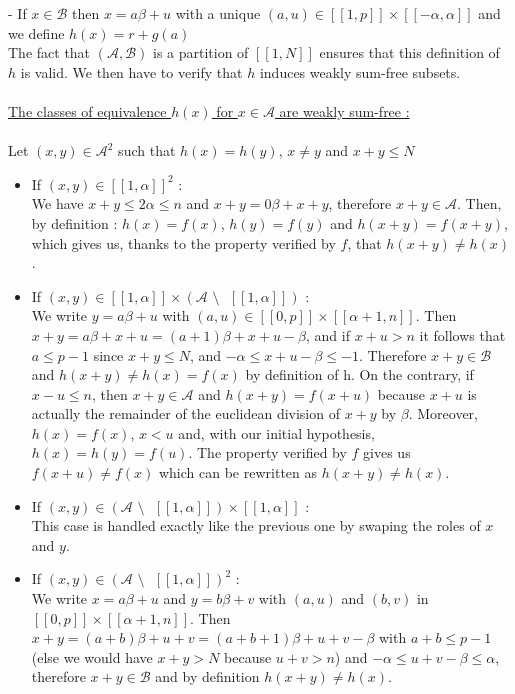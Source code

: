 \documentclass{article}
\newtheorem{computational theorem}{Computational Theorem}[theorem]
\begin{document}
- If $x \in \mathcal{B}$ then $x = a\beta + u$ with a unique $(a,u) \in [\![1,p]\!] \times [\![-\alpha,\alpha]\!]$ and we define $h(x) = r + g(a)$\\
The fact that $(\mathcal{A}, \mathcal{B})$ is a partition of $[\![1,N]\!]$ ensures that this definition of $h$ is valid. We then have to verify that $h$ induces weakly sum-free subsets.\\
\\
\underline{The classes of equivalence $h(x)$ for $x \in \mathcal{A}$ are weakly sum-free :}
\\
\\
Let $(x,y) \in \mathcal{A}^2$ such that $h(x) = h(y)$, $x \neq y$ and $x + y \leqslant N$
\begin{itemize}
\item If $(x,y) \in [\![1,\alpha]\!]^2$ :\\
We have $x + y \leqslant 2\alpha \leqslant n$ and $x + y = 0\beta + x + y$, therefore $x + y \in \mathcal{A}$. Then, by definition : $h(x) = f(x)$, $h(y) = f(y)$ and $h(x+y) = f(x+y)$, which gives us, thanks to the property verified by $f$, that $h(x+y) \neq h(x)$.
\item If $(x,y) \in [\![1,\alpha]\!] \times ( \mathcal{A} \text{ \textbackslash} \text{ } [\![1,\alpha]\!] )$ :\\
We write $y = a\beta + u$ with $(a,u) \in [\![0,p]\!] \times [\![\alpha + 1,n]\!]$. Then $x+y = a\beta + x + u = (a+1)\beta + x + u - \beta$, and if $x + u > n$ it follows that $a \leqslant p-1$ since $x+y \leqslant N$, and $-\alpha \leqslant x + u - \beta \leqslant -1$. Therefore $x+y \in \mathcal{B}$ and $h(x+y) \neq h(x) = f(x)$ by definition of h. On the contrary, if $x - u \leqslant n$, then $x+y \in \mathcal{A}$ and $h(x+y) = f(x+u)$ because $x+u$ is actually the remainder of the euclidean division of $x+y$ by $\beta$. Moreover, $h(x) = f(x)$, $x < u$ and, with our initial hypothesis, $h(x) = h(y) = f(u)$. The property verified by $f$ gives us $f(x+u) \neq f(x)$ which can be rewritten as $h(x+y) \neq h(x)$.
\item If $(x,y) \in ( \mathcal{A} \text{ \textbackslash} \text{ } [\![1,\alpha]\!] ) \times [\![1,\alpha]\!]$ : \\
This case is handled exactly like the previous one by swaping the roles of $x$ and $y$.
\item If $(x,y) \in ( \mathcal{A} \text{ \textbackslash} \text{ } [\![1,\alpha]\!] )^2$ : \\
We write $x = a\beta + u$ and $y = b\beta + v$ with $(a,u)$ and $(b,v)$ in $[\![0,p]\!] \times [\![\alpha + 1,n]\!]$. Then $x+y = (a+b)\beta + u+v = (a+b+1)\beta + u + v - \beta$ with $a+b \leqslant p-1$ (else we would have $x+y > N$ because $u+v > n$) and $-\alpha \leqslant u + v - \beta \leqslant \alpha$, therefore $x+y \in \mathcal{B}$ and by definition $h(x+y) \neq h(x)$.
\end{itemize}
\end{document}
